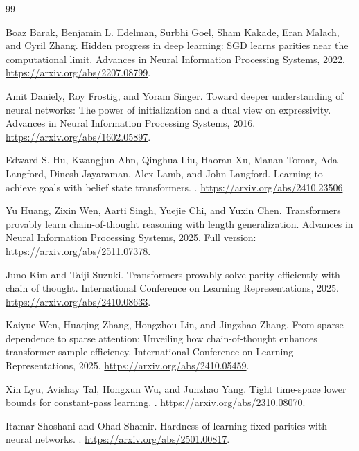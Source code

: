 \documentclass[11pt,twoside]{article}
\theoremstyle{definition}
\theoremstyle{remark}
\begin{document}
\begin{thebibliography}{99}

Boaz Barak, Benjamin L. Edelman, Surbhi Goel, Sham Kakade, Eran Malach,
and Cyril Zhang.
\newblock Hidden progress in deep learning: SGD learns parities near the
computational limit.
\newblock Advances in Neural Information Processing Systems, 2022.
\newblock \url{https://arxiv.org/abs/2207.08799}.

Amit Daniely, Roy Frostig, and Yoram Singer.
\newblock Toward deeper understanding of neural networks: The power of
initialization and a dual view on expressivity.
\newblock Advances in Neural Information Processing Systems, 2016.
\newblock \url{https://arxiv.org/abs/1602.05897}.

Edward S. Hu, Kwangjun Ahn, Qinghua Liu, Haoran Xu, Manan Tomar,
Ada Langford, Dinesh Jayaraman, Alex Lamb, and John Langford.
\newblock Learning to achieve goals with belief state transformers.
. \url{https://arxiv.org/abs/2410.23506}.

Yu Huang, Zixin Wen, Aarti Singh, Yuejie Chi, and Yuxin Chen.
\newblock Transformers provably learn chain-of-thought reasoning with
length generalization.
\newblock Advances in Neural Information Processing Systems, 2025.
\newblock Full version: \url{https://arxiv.org/abs/2511.07378}.

Juno Kim and Taiji Suzuki.
\newblock Transformers provably solve parity efficiently with chain of thought.
\newblock International Conference on Learning Representations, 2025.
\newblock \url{https://arxiv.org/abs/2410.08633}.

Kaiyue Wen, Huaqing Zhang, Hongzhou Lin, and Jingzhao Zhang.
\newblock From sparse dependence to sparse attention: Unveiling how
chain-of-thought enhances transformer sample efficiency.
\newblock International Conference on Learning Representations, 2025.
\newblock \url{https://arxiv.org/abs/2410.05459}.

Xin Lyu, Avishay Tal, Hongxun Wu, and Junzhao Yang.
\newblock Tight time-space lower bounds for constant-pass learning.
. \url{https://arxiv.org/abs/2310.08070}.

Itamar Shoshani and Ohad Shamir.
\newblock Hardness of learning fixed parities with neural networks.
. \url{https://arxiv.org/abs/2501.00817}.

\end{thebibliography}
\end{document}
